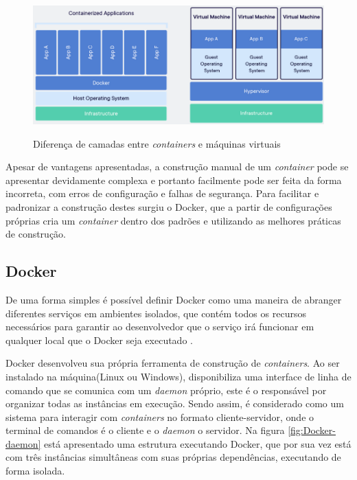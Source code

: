 	\begin{figure}[htb]
		\caption{Diferença de camadas entre \textit{containers} e máquinas virtuais}
		{\parbox{6cm}{
				\includegraphics[width=15cm]{images/container_x_vm.png}
				\label{fig:Docker-container-vm}
		}}
	\end{figure}

	Apesar de vantagens apresentadas, a construção manual de um \textit{container} pode se apresentar devidamente complexa e portanto facilmente pode ser feita da forma incorreta, com erros de configuração e falhas de segurança. Para facilitar e padronizar a construção destes surgiu o Docker, que a partir de configurações próprias cria um \textit{container} dentro dos padrões e utilizando as melhores práticas de construção.
\subsection{Docker}
	De uma forma simples é possível definir Docker como uma maneira de abranger diferentes serviços em ambientes isolados, que contém todos os recursos necessários para garantir ao desenvolvedor que o serviço irá funcionar em qualquer local que o Docker seja executado \cite{Hane}.
	
	Docker desenvolveu sua própria ferramenta de construção de \textit{containers}. Ao ser instalado na máquina(Linux ou Windows), disponibiliza uma interface de linha de comando que se comunica com um \textit{daemon} próprio, este é o responsável por organizar todas as instâncias em execução. Sendo assim, é considerado como um sistema para interagir com \textit{containers} no formato cliente-servidor, onde o terminal de comandos é o cliente e o \textit{daemon} o servidor. Na figura \ref{fig:Docker-daemon} está apresentado uma estrutura executando Docker, que por sua vez está com três instâncias simultâneas com suas próprias dependências, executando de forma isolada.
	
